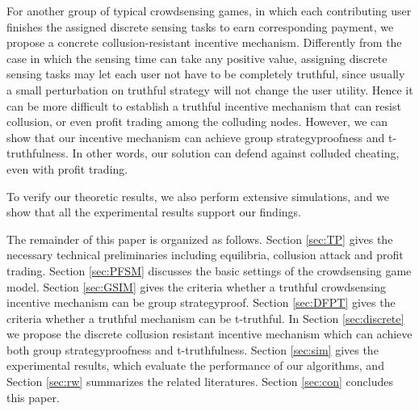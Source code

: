 \documentclass[conference]{IEEEtran}
\theoremstyle{definition}
\begin{document}
\bolditem For another group of typical crowdsensing games, in which each contributing user finishes the assigned discrete sensing tasks to earn corresponding payment, we propose a concrete collusion-resistant incentive mechanism. %
{\color{black}Differently from the case in which the sensing time can take any positive value, assigning discrete sensing tasks may let each user not have to be completely truthful, since usually a small perturbation on truthful strategy will not change the user utility. Hence it can be more difficult to establish a truthful incentive mechanism that can resist collusion, or even profit trading among the colluding nodes. 
However, we can show that our incentive mechanism can achieve group strategyproofness and t-truthfulness. In other words, our solution can defend against colluded cheating, even with profit trading.}


\bolditem To verify our theoretic results, we also perform extensive simulations, and we show that all the experimental results support our findings.

{\color{black}
The remainder of this paper is organized as follows. Section \ref{sec:TP} gives the necessary technical preliminaries including equilibria, collusion attack and profit trading. Section \ref{sec:PFSM} discusses the basic settings of the crowdsensing game model. Section \ref{sec:GSIM} gives the criteria whether a truthful crowdsensing incentive mechanism can be group strategyproof. Section \ref{sec:DFPT} gives the criteria whether a truthful mechanism can be t-truthful. 
In Section \ref{sec:discrete} we propose the discrete collusion resistant incentive mechanism which can achieve both group strategyproofness and t-truthfulness. 
Section \ref{sec:sim} gives the experimental results, which evaluate the performance of our algorithms, and Section \ref{sec:rw} summarizes the related literatures. Section \ref{sec:con} concludes this paper.
}
\end{document}
